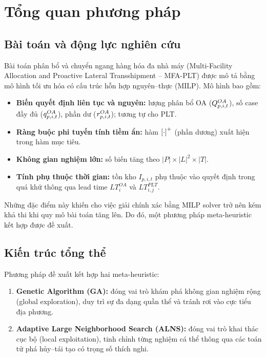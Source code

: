 
\section{Tổng quan phương pháp}

\subsection{Bài toán và động lực nghiên cứu}

Bài toán phân bổ và chuyển ngang hàng hóa đa nhà máy (Multi-Facility Allocation and Proactive Lateral Transshipment -- MFA-PLT) được mô tả bằng mô hình tối ưu hóa có cấu trúc hỗn hợp nguyên--thực (MILP). Mô hình bao gồm:

\begin{itemize}
  \item \textbf{Biến quyết định liên tục và nguyên:} lượng phân bổ OA ($Q^{OA}_{p,i,t}$), số case đầy đủ ($q^{OA}_{p,i,t}$), phần dư ($r^{OA}_{p,i,t}$); tương tự cho PLT.
  \item \textbf{Ràng buộc phi tuyến tính tiềm ẩn:} hàm $\left[\cdot\right]^+$ (phần dương) xuất hiện trong hàm mục tiêu.
  \item \textbf{Không gian nghiệm lớn:} số biến tăng theo $|P| \times |L|^2 \times |T|$.
  \item \textbf{Tính phụ thuộc thời gian:} tồn kho $I_{p,i,t}$ phụ thuộc vào quyết định trong quá khứ thông qua lead time $LT_i^{OA}$ và $LT_{i,j}^{PLT}$.
\end{itemize}

Những đặc điểm này khiến cho việc giải chính xác bằng MILP solver trở nên kém khả thi khi quy mô bài toán tăng lên. Do đó, một phương pháp meta-heuristic kết hợp được đề xuất.

\subsection{Kiến trúc tổng thể}

Phương pháp đề xuất kết hợp hai meta-heuristic:

\begin{enumerate}
  \item \textbf{Genetic Algorithm (GA):} đóng vai trò khám phá không gian nghiệm rộng (global exploration), duy trì sự đa dạng quần thể và tránh rơi vào cực tiểu địa phương.
  \item \textbf{Adaptive Large Neighborhood Search (ALNS):} đóng vai trò khai thác cục bộ (local exploitation), tinh chỉnh từng nghiệm cá thể thông qua các toán tử phá hủy--tái tạo có trọng số thích nghi.
\end{enumerate}

